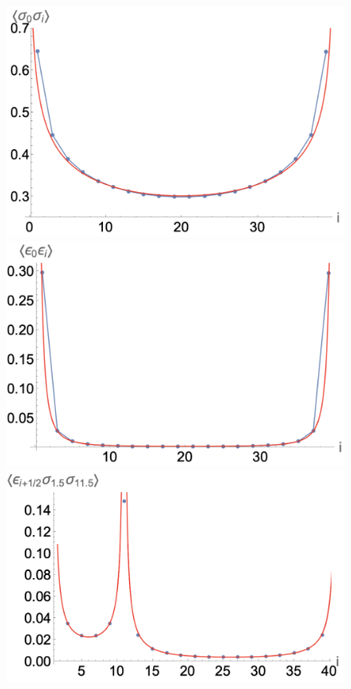 \documentclass[prb,twocolumn,11pt]{revtex4-1}
\begin{document}
\begin{figure}[htbp]
\centering
\includegraphics[scale=0.35]{ss_long_range.png}
\includegraphics[scale=0.35]{ee_long_range.png}
\includegraphics[scale=0.35]{ess_long_range.png}

\end{figure}
\end{document}
